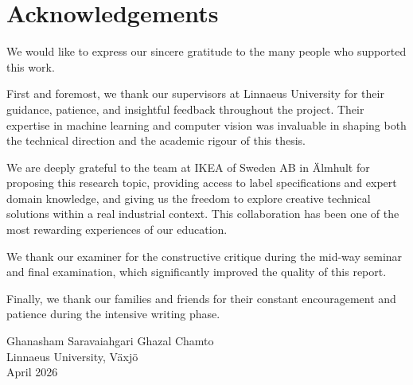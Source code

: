\chapter*{Acknowledgements}

We would like to express our sincere gratitude to the many people who supported this work.

First and foremost, we thank our supervisors at Linnaeus University for their guidance,
patience, and insightful feedback throughout the project. Their expertise in machine learning
and computer vision was invaluable in shaping both the technical direction and the academic
rigour of this thesis.

We are deeply grateful to the team at IKEA of Sweden AB in Älmhult for proposing this
research topic, providing access to label specifications and expert domain knowledge, and
giving us the freedom to explore creative technical solutions within a real industrial context.
This collaboration has been one of the most rewarding experiences of our education.

We thank our examiner for the constructive critique during the mid-way seminar and final
examination, which significantly improved the quality of this report.

Finally, we thank our families and friends for their constant encouragement and patience during
the intensive writing phase.

\vspace{2em}
\begin{flushright}
Ghanasham Saravaiahgari \quad Ghazal Chamto\\
Linnaeus University, Växjö\\
April 2026
\end{flushright}
\clearpage
